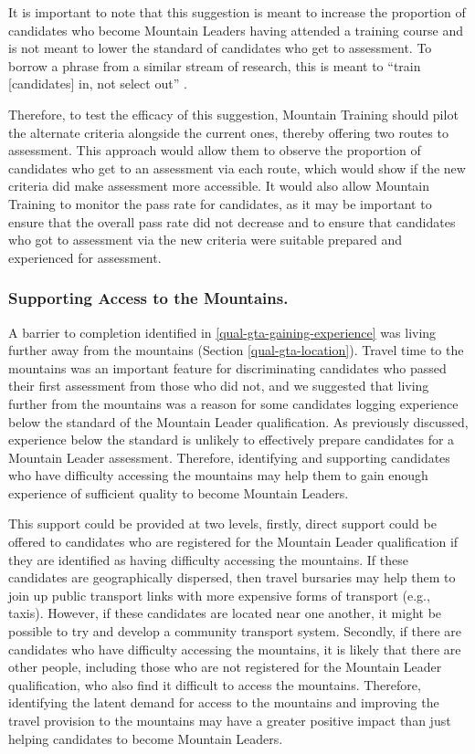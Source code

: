 \documentclass[
  12pt,
  a4paper,
]{book}
\begin{document}
It is important to note that this suggestion is meant to increase the proportion of candidates who become Mountain Leaders having attended a training course and is not meant to lower the standard of candidates who get to assessment. To borrow a phrase from a similar stream of research, this is meant to ``train {[}candidates{]} in, not select out'' \citep{Hardy2014d}.

Therefore, to test the efficacy of this suggestion, Mountain Training should pilot the alternate criteria alongside the current ones, thereby offering two routes to assessment. This approach would allow them to observe the proportion of candidates who get to an assessment via each route, which would show if the new criteria did make assessment more accessible. It would also allow Mountain Training to monitor the pass rate for candidates, as it may be important to ensure that the overall pass rate did not decrease and to ensure that candidates who got to assessment via the new criteria were suitable prepared and experienced for assessment.

\hypertarget{supporting-access-to-the-mountains.}{%
\subsubsection{Supporting Access to the Mountains.}\label{supporting-access-to-the-mountains.}}

A barrier to completion identified in \ref{qual-gta-gaining-experience} was living further away from the mountains (Section \ref{qual-gta-location}). Travel time to the mountains was an important feature for discriminating candidates who passed their first assessment from those who did not, and we suggested that living further from the mountains was a reason for some candidates logging experience below the standard of the Mountain Leader qualification. As previously discussed, experience below the standard is unlikely to effectively prepare candidates for a Mountain Leader assessment. Therefore, identifying and supporting candidates who have difficulty accessing the mountains may help them to gain enough experience of sufficient quality to become Mountain Leaders.

This support could be provided at two levels, firstly, direct support could be offered to candidates who are registered for the Mountain Leader qualification if they are identified as having difficulty accessing the mountains. If these candidates are geographically dispersed, then travel bursaries may help them to join up public transport links with more expensive forms of transport (e.g., taxis). However, if these candidates are located near one another, it might be possible to try and develop a community transport system. Secondly, if there are candidates who have difficulty accessing the mountains, it is likely that there are other people, including those who are not registered for the Mountain Leader qualification, who also find it difficult to access the mountains. Therefore, identifying the latent demand for access to the mountains and improving the travel provision to the mountains may have a greater positive impact than just helping candidates to become Mountain Leaders.
\end{document}
